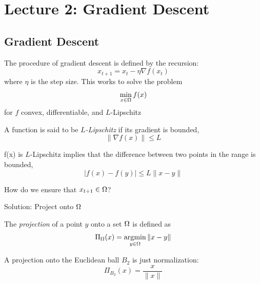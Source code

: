 \section{Lecture 2: Gradient Descent}

\subsection{Gradient Descent}

The procedure of gradient descent is defined by the recursion:
\[
x_{t+1} = x_t - \eta \nabla f(x_t)
\]
where $\eta$ is the step size. This works to solve the problem
\[
\min_{x\in\Omega} f(x)
\]
for $f$ convex, differentiable, and $L$-Lipschitz

\begin{definition}[$L$-Lipschitz]
A function is said to be \emph{$L$-Lipschitz} if its gradient is bounded,
\[
\|\nabla f(x)\| \leq L
\]
\end{definition}

\begin{fact}
f(x) is $L$-Lipschitz implies that the difference between two points in the range is bounded,
\[
|f(x) - f(y)| \leq L \|x - y\|
\]
\end{fact}

\begin{question}
How do we ensure that $x_{t+1}\in\Omega$?
\end{question}

Solution: Project onto $\Omega$

\begin{definition}[Projection]
The \emph{projection} of a point $y$ onto a set $\Omega$ is defined as
\[
\Pi_{\Omega}(x) = \operatorname*{\arg\!\min}_{y\in\Omega} \|x-y\|
\]
\end{definition}

\begin{example}
A projection onto the Euclidean ball $B_2$ is just normalization:
\[
\Pi_{B_2}(x) = \dfrac{x}{\|x\|}
\]
\end{example}

